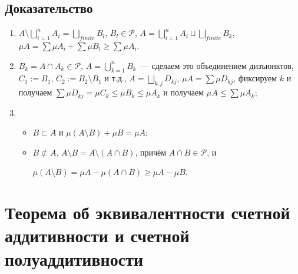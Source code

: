 \documentclass{article}
\begin{document}
        \subsection{Доказательство}
        
            \begin{enumerate}
            
                \item $A \setminus \bigsqcup\limits^n_{i = 1} A_i = \bigsqcup\limits_{finite} B_l$, $B_l \in \mathcal{P}$, $A = \bigsqcup\limits^n_{i = 1} A_i \sqcup \bigsqcup\limits_{finite} B_k$, $\mu A = \sum \mu A_i + \sum \mu B_l \geq \sum \mu A_i$.
                
                \item $B_k = A \cap A_k \in \mathcal{P}$, $A = \bigcup\limits^n_{k = 1} B_k$~--- сделаем это объединением дизъюнктов, $C_1 := B_1$, $C_2 := B_2 \setminus B_1$ и т.д., $A = \bigsqcup\limits_{k, j} D_{kj}$, $\mu A = \sum \mu D_{kj}$, фиксируем $k$ и получаем $\sum \mu D_{kj} = \mu C_k \leq \mu B_k \leq \mu A_k$ и получаем $\mu A \leq \sum \mu A_k$;
                
                \item
                    
                    \begin{itemize}
                    
                        \item $B \subset A$ и $\mu \left( A \setminus B \right) + \mu B = \mu A$;
                        
                        \item $B \not\subset A$, $A \setminus B = A \setminus (A \cap B)$, причём $A \cap B \in \mathcal{P}$, и
                        
                            $\mu \left( A \setminus B \right) = \mu A - \mu \left( A \cap B \right) \geq \mu A - \mu B$.
                            
                    \end{itemize}
                    
            \end{enumerate}
            
    \newpage
    
    \section{Теорема об эквивалентности счетной аддитивности и счетной полуаддитивности}
    
\end{document}
